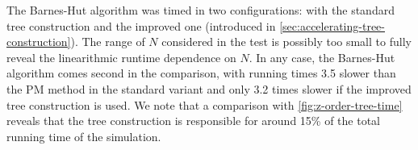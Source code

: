 The Barnes-Hut algorithm was timed in two configurations: with the standard tree construction and the improved one (introduced in \autoref{sec:accelerating-tree-construction}).
The range of $N$ considered in the test is possibly too small to fully reveal the linearithmic runtime dependence on $N$.
In any case, the Barnes-Hut algorithm comes second in the comparison, with running times 3.5 slower than the PM method in the standard variant and only 3.2 times slower if the improved tree construction is used.
We note that a comparison with \autoref{fig:z-order-tree-time} reveals that the tree construction is responsible for around 15\% of the total running time of the simulation.